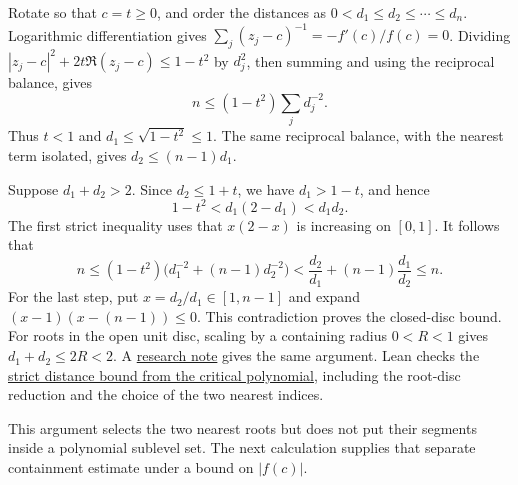 Rotate so that $c=t\ge0$, and order the distances
as $0<d_1\le d_2\le\cdots\le d_n$. Logarithmic differentiation gives
$\sum_j(z_j-c)^{-1}=-f'(c)/f(c)=0$. Dividing
$|z_j-c|^2+2t\Re(z_j-c)\le1-t^2$ by $d_j^2$, then summing and using
the reciprocal balance, gives
\[
 n\le(1-t^2)\sum_jd_j^{-2}.
\]
Thus $t<1$ and $d_1\le\sqrt{1-t^2}\le1$. The same reciprocal balance,
with the nearest term isolated, gives $d_2\le(n-1)d_1$.

Suppose $d_1+d_2>2$. Since $d_2\le1+t$, we have $d_1>1-t$, and hence
\[
 1-t^2<d_1(2-d_1)<d_1d_2.
\]
The first strict inequality uses that $x(2-x)$ is increasing on $[0,1]$.
It follows that
\[
 n\le(1-t^2)\bigl(d_1^{-2}+(n-1)d_2^{-2}\bigr)
 <\frac{d_2}{d_1}+(n-1)\frac{d_1}{d_2}\le n.
\]
For the last step, put $x=d_2/d_1\in[1,n-1]$ and expand
$(x-1)(x-(n-1))\le0$. This contradiction proves the closed-disc bound.
For roots in the open unit disc, scaling by a containing radius
$0<R<1$ gives $d_1+d_2\le2R<2$.
A
\href{https://github.com/wcook04/plectis-erdos/blob/a729f05c40398663fd586c9da487ad874d898639/research_corpus/Erdos1041/GlobalCriticalTwoNearestBudget.md}{research note} gives the same argument. Lean checks the \href{https://github.com/wcook04/plectis-erdos/blob/52d6c45ad203ba619cb5fe6ba485c0b5400519ea/lean/ErdosProblems/Erdos1041/PaperCompleteR20/TwoNearestPolynomial.lean\#L31}{strict distance bound from the critical polynomial}, including the root-disc reduction and the choice of the two nearest indices.

This argument selects the two nearest roots but does not put their
segments inside a polynomial sublevel set. The next calculation supplies
that separate containment estimate under a bound on $|f(c)|$.

